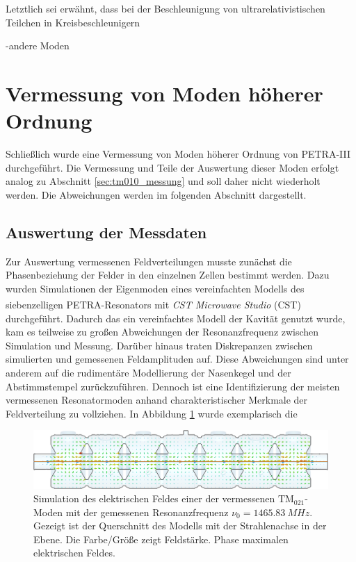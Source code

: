 Letztlich sei erwähnt, dass bei der Beschleunigung von ultrarelativistischen Teilchen in Kreisbeschleunigern 



-andere Moden\\

\section{Vermessung von Moden höherer Ordnung}
\label{sec:hom_messung}
Schließlich wurde eine Vermessung von Moden höherer Ordnung von PETRA-III durchgeführt.
Die Vermessung und Teile der Auswertung dieser Moden erfolgt analog zu Abschnitt \ref{sec:tm010_messung} und soll daher nicht wiederholt werden.
Die Abweichungen werden im folgenden Abschnitt dargestellt.

\subsection{Auswertung der Messdaten}
Zur Auswertung vermessenen Feldverteilungen musste zunächst die Phasenbeziehung der Felder in den einzelnen Zellen bestimmt werden.
Dazu wurden Simulationen der Eigenmoden eines vereinfachten Modells des siebenzelligen PETRA-Resonators  mit \textit{CST Microwave Studio\textsuperscript{\textregistered}} (CST) durchgeführt.
Dadurch das ein vereinfachtes Modell der Kavität genutzt wurde, kam es teilweise zu großen Abweichungen der Resonanzfrequenz zwischen Simulation und Messung.
Darüber hinaus traten Diskrepanzen zwischen simulierten und gemessenen Feldamplituden auf.
Diese Abweichungen sind unter anderem auf die rudimentäre Modellierung der Nasenkegel und der Abstimmstempel zurückzuführen.
Dennoch ist eine Identifizierung der meisten vermessenen Resonatormoden anhand charakteristischer Merkmale der Feldverteilung zu vollziehen.
In Abbildung \ref{fig:cst_sim} wurde exemplarisch die
\begin{figure}[h]
	\centering
	\includegraphics[width=1.0\textwidth]{./figs/TM021-CST/1465_R_cut.png}
	\caption{Simulation des elektrischen Feldes einer der vermessenen $\mathrm{TM}_{021}$-Moden mit der gemessenen Resonanzfrequenz $\nu_0 = \SI{1465.83}{MHz}$. Gezeigt ist der Querschnitt des Modells mit der Strahlenachse in der Ebene. Die Farbe/Größe zeigt Feldstärke. Phase maximalen elektrischen Feldes.}
	\label{fig:cst_sim}
\end{figure}







